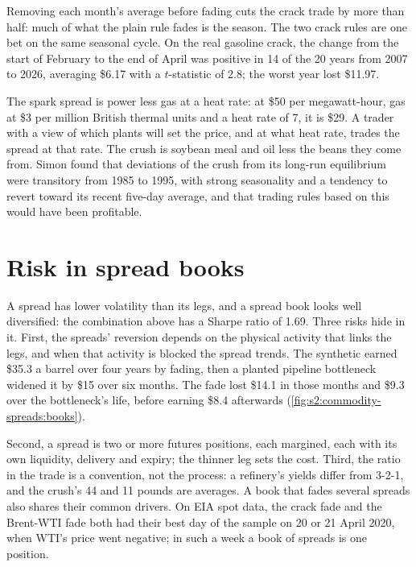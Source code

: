 Removing each month's average before fading cuts the crack trade by more than half: much of what the plain rule fades is the season. The two crack
rules are one bet on the same seasonal cycle. On the real gasoline crack, the change from the start of February to the end of April was positive in 14
of the 20 years from 2007 to 2026, averaging \$6.17 with a $t$-statistic of 2.8; the worst year lost \$11.97.

The spark spread is power less gas at a heat rate: at \$50 per megawatt-hour, gas at \$3 per million British thermal units and a heat rate of 7, it
is \$29. A trader with a view of which plants will set the price, and at what heat rate, trades the spread at that rate. The crush is soybean meal
and oil less the beans they come from. Simon found that deviations of the crush from its long-run equilibrium were transitory from 1985 to 1995, with
strong seasonality and a tendency to revert toward its recent five-day average, and that trading rules based on this would have been profitable.

\section{Risk in spread books}

A spread has lower volatility than its legs, and a spread book looks well diversified: the combination above has a Sharpe ratio of 1.69. Three risks
hide in it. First, the spreads' reversion depends on the physical activity that links the legs, and when that activity is blocked the spread trends.
The synthetic  earned \$35.3 a barrel over four years by fading, then a planted pipeline bottleneck widened it by \$15 over six months.
The fade lost \$14.1 in those months and \$9.3 over the bottleneck's life, before earning \$8.4 afterwards
(\cref{fig:s2:commodity-spreads:books}).

Second, a spread is two or more futures positions, each margined, each with its own liquidity, delivery and expiry; the thinner leg sets the cost.
Third, the ratio in the trade is a convention, not the process: a refinery's yields differ from 3-2-1, and the crush's 44 and 11 pounds are averages.
A book that fades several spreads also shares their common drivers. On EIA spot data, the crack fade and the Brent-WTI fade both had their best day
of the sample on 20 or 21 April 2020, when WTI's price went negative; in such a week a book of spreads is one position.

